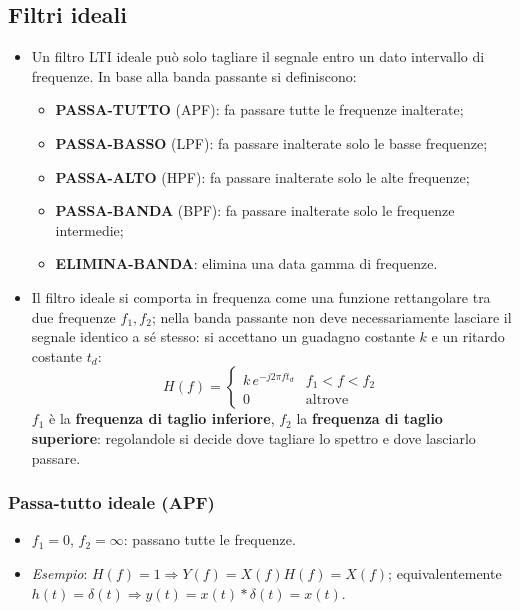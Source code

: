 \documentclass[12pt, a4paper]{article}
\begin{document}
\subsection{Filtri ideali}
\begin{itemize}
    \item Un filtro LTI ideale può solo tagliare il segnale entro un dato intervallo di frequenze. In base alla banda passante si definiscono:
    \begin{itemize}
        \item \textbf{PASSA-TUTTO} (APF): fa passare tutte le frequenze inalterate;
        \item \textbf{PASSA-BASSO} (LPF): fa passare inalterate solo le basse frequenze;
        \item \textbf{PASSA-ALTO} (HPF): fa passare inalterate solo le alte frequenze;
        \item \textbf{PASSA-BANDA} (BPF): fa passare inalterate solo le frequenze intermedie;
        \item \textbf{ELIMINA-BANDA}: elimina una data gamma di frequenze.
    \end{itemize}
    \item Il filtro ideale si comporta in frequenza come una funzione rettangolare tra due frequenze $f_1, f_2$; nella banda passante non deve necessariamente lasciare il segnale identico a sé stesso: si accettano un guadagno costante $k$ e un ritardo costante $t_d$:
    $$H(f) = \begin{cases} k\,e^{-j2\pi ft_d} & f_1<f<f_2 \\ 0 & \text{altrove}\end{cases}$$
    $f_1$ è la \textbf{frequenza di taglio inferiore}, $f_2$ la \textbf{frequenza di taglio superiore}: regolandole si decide dove tagliare lo spettro e dove lasciarlo passare.
\end{itemize}

\subsubsection{Passa-tutto ideale (APF)}
\begin{itemize}
    \item $f_1=0$, $f_2=\infty$: passano tutte le frequenze.
    \item \textit{Esempio}: $H(f)=1 \Rightarrow Y(f)=X(f)H(f)=X(f)$; equivalentemente $h(t)=\delta(t) \Rightarrow y(t)=x(t)*\delta(t)=x(t)$.
\end{itemize}
\end{document}
